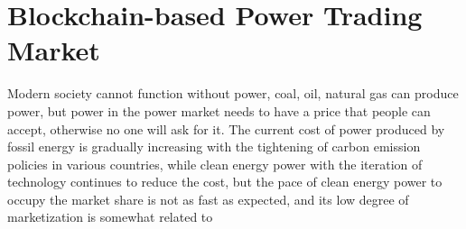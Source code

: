 \section{Blockchain-based Power Trading Market}
Modern society cannot function without power, coal, oil, natural gas can produce power, but power in the power market needs to have a price that people can accept, otherwise no one will ask for it. The current cost of power produced by fossil energy is gradually increasing with the tightening of carbon emission policies in various countries, while clean energy power with the iteration of technology continues to reduce the cost, but the pace of clean energy power to occupy the market share is not as fast as expected, and its low degree of marketization is somewhat related to \cite{renewableenergy}

